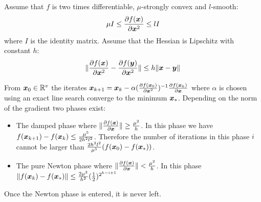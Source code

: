 \begin{prop}
  \label{eq:conv:newton}
  Assume that $f$ is two times differentiable, $\mu$-strongly convex and $l$-smooth:
  \begin{equation}
    \mu I \leq \partialfrac{\xb^2}{f(\xb)} \leq l I
  \end{equation}
  where $I$ is the identity matrix.
  Assume that the Hessian is Lipschitz with constant $h$:
  \begin{equation}
  \| \partialfrac{\xb^2}{f(\xb)} - \partialfrac{\xb^2}{f(\yb)} \| \leq h \| \xb
  - \yb \|
 \end{equation}

  From $\xb_0 \in \RR^v$  the iterates
  $\xb_{k+1} = \xb_k -\alpha (\partialfrac{\xb^2}{f(\xb_0)})^{-1}
  \partialfrac{\xb}{f(\xb_k)}$ where $\alpha$ is chosen using an exact line
  search converge to the
  minimum $\xb_*$.
  Depending on the norm of the gradient two phases exist:
  \begin{itemize}
  \item The damped phase where $\| \partialfrac{\xb}{f(\xb)} \| \geq \frac{\mu^2}{h}$.
    In this phase we have $f(\xb_{k+1}) - f(\xb_k) \leq \frac{\mu^5}{2h^2 l^2}$.
    Therefore the number of iterations in this phase $i$ cannot be larger than
    $\frac{2 h^2 l^2}{\mu^5}(f(\xb_0) - f(\xb_*))$.
  \item The pure Newton phase where $\| \partialfrac{\xb}{f(\xb)} \| < \frac{\mu^2}{h}$.
      In this phase $\|f(\xb_{k}) - f(\xb_*)\| \leq \frac{2 \mu^3}{h^2}
      (\frac12)^{2^{k -i +1}}$
 \end{itemize}
 Once the Newton phase is entered, it is never left.
\end{prop}
